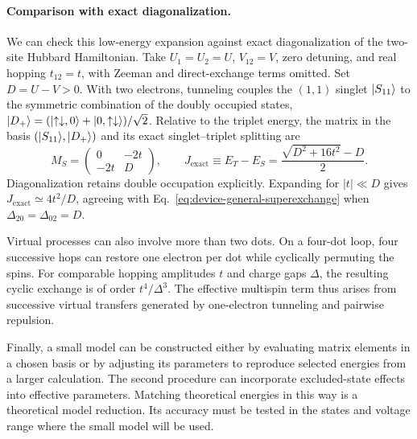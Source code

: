 \paragraph{Comparison with exact diagonalization.}
We can check this low-energy expansion against exact
diagonalization of the two-site Hubbard Hamiltonian.
Take $U_1=U_2=U$, $V_{12}=V$, zero detuning,
and real hopping $t_{12}=t$, with Zeeman and direct-exchange
terms omitted. Set $D=U-V>0$. With two electrons, tunneling
couples the $(1,1)$ singlet $\lvert S_{11}\rangle$ to the symmetric
combination of the doubly occupied states,
$\lvert D_+\rangle=(\lvert \uparrow\downarrow,0\rangle
+\lvert 0,\uparrow\downarrow\rangle)/\sqrt2$.
Relative to the triplet energy, the matrix in the basis
$(\lvert S_{11}\rangle,\lvert D_+\rangle)$ and its exact singlet--triplet
splitting are
\begin{equation}
 M_S=\begin{pmatrix}0&-2t\\-2t&D\end{pmatrix},
 \qquad
 J_{\mathrm{exact}}\equiv E_T-E_S
     =\frac{\sqrt{D^2+16t^2}-D}{2}.
 \label{eq:device-exact-hubbard-check}
\end{equation}
Diagonalization retains double occupation explicitly. Expanding
for $|t|\ll D$ gives $J_{\mathrm{exact}}\simeq4t^2/D$, agreeing
with Eq.~\eqref{eq:device-general-superexchange} when
$\Delta_{20}=\Delta_{02}=D$.

Virtual processes can also involve more than two dots.
On a four-dot loop, four successive hops can restore one
electron per dot while cyclically permuting the spins.
For comparable hopping amplitudes $t$ and charge gaps $\Delta$,
the resulting cyclic exchange is of order $t^4/\Delta^3$.
The effective multispin term thus arises from successive virtual
transfers generated by one-electron tunneling and pairwise
repulsion.

Finally, a small model can be constructed either by evaluating
matrix elements in a chosen basis or by adjusting its parameters
to reproduce selected energies from a larger calculation.
The second procedure can incorporate excluded-state effects
into effective parameters. Matching theoretical energies in
this way is a theoretical model reduction. Its accuracy must be tested in the states and
voltage range where the small model will be used.
